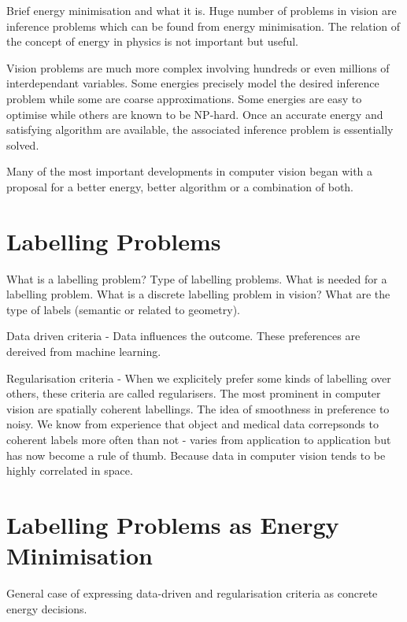 Brief energy minimisation and what it is. Huge number of problems in vision are inference problems which can be found from energy minimisation. The relation of the concept of energy in physics is not important but useful.

Vision problems are much more complex involving hundreds or even millions of interdependant variables. Some energies precisely model the desired inference problem while some are coarse approximations. Some energies are easy to optimise while others are known to be NP-hard. Once an accurate energy and satisfying algorithm are available, the associated inference problem is essentially solved.

Many of the most important developments in computer vision began with a proposal for a better energy, better algorithm or a combination of both.


\section{Labelling Problems}

What is a labelling problem? Type of labelling problems. What is needed for a labelling problem. What is a discrete labelling problem in vision? What are the type of labels (semantic or related to geometry).

Data driven criteria - Data influences the outcome. These preferences are dereived from machine learning.

Regularisation criteria - When we explicitely prefer some kinds  of labelling over others, these criteria are called regularisers. The most prominent in computer vision are spatially coherent labellings. The idea of smoothness in preference to noisy. We know from experience that object and medical data correpsonds to coherent labels more often than not - varies from application to application but has now become a rule of thumb. Because data in computer vision tends to be highly correlated in space.


\section{Labelling Problems as Energy Minimisation}

General case of expressing data-driven and regularisation criteria as concrete energy decisions.

